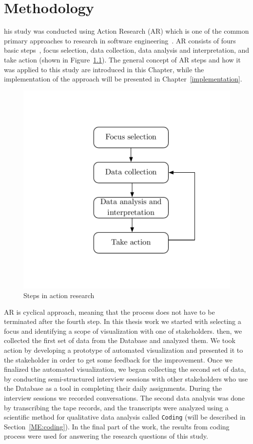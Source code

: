 \chapter{Methodology}
\label{methodology}
\lettrine[findent=2pt]{}{ }his study was conducted using Action Research (AR) which is one of the common primary approaches to research in software engineering~\cite{Sjoberg}. AR consists of fours basic steps~\cite{Glanz}, focus selection, data collection, data analysis and interpretation, and take action (shown in Figure~\ref{fig:action_research}). The general concept of AR steps and how it was applied to this study are introduced in this Chapter, while the implementation of the approach will be presented in Chapter~\ref{implementation}.

\begin{figure}[H]
\centering
\captionsetup{justification=centering}
\vspace{0cm}%
\includegraphics[width=0.3\linewidth]{figure/misc/ar.pdf}
\caption{Steps in action research}
\label{fig:action_research}
\end{figure}

AR is cyclical approach, meaning that the process does not have to be terminated after the fourth step. In this thesis work we started with selecting a focus and identifying a scope of visualization with one of stakeholders. then, we collected the first set of data from the Database and analyzed them. We took action by developing a prototype of automated visualization and presented it to the stakeholder in order to get some feedback for the improvement. Once we finalized the automated visualization, we began collecting the second set of data, by conducting semi-structured interview sessions with other stakeholders who use the Database as a tool in completing their daily assignments. During the interview sessions we recorded conversations. The second data analysis was done by transcribing the tape records, and the transcripts were analyzed using a scientific method for qualitative data analysis called \texttt{Coding} (will be described in Section~\ref{ME:coding}). In the final part of the work, the results from coding process were used for answering the research questions of this study.

